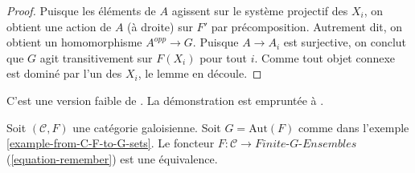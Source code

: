 \begin{proof}
\medskip\noindent
Puisque les éléments de $A$ agissent sur le système projectif des $X_i$, on obtient une action de
$A$ (à droite) sur $F'$ par précomposition. Autrement dit, on obtient
un homomorphisme $A^{opp} \to G$. Puisque $A \to A_i$ est surjective, on conclut
que $G$ agit transitivement sur $F(X_i)$ pour tout $i$. Comme tout objet connexe
est dominé par l'un des $X_i$, le lemme en découle.
\end{proof}

\begin{proposition}
\label{proposition-galois}
\begin{reference}
C'est une version faible de \cite[Expos\'e V]{SGA1}.
La démonstration est empruntée à \cite[Théorème 7.2.5]{BS}.
\end{reference}
Soit $(\mathcal{C}, F)$ une catégorie galoisienne. Soit $G = \text{Aut}(F)$
comme dans l'exemple \ref{example-from-C-F-to-G-sets}. Le foncteur
$F : \mathcal{C} \to \textit{Finite-}G\textit{-Ensembles}$
(\ref{equation-remember}) est une équivalence.
\end{proposition}

